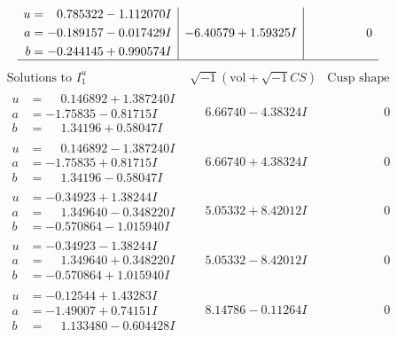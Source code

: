 \documentclass[1p]{elsarticle_modified}
\theoremstyle{definition}
\newcommand{\I}{\sqrt{-1}}
\begin{document}
$$\begin{array}{c|c|c}
\begin{aligned}
u &= \phantom{-}0.785322 - 1.112070 I \\
a &= -0.189157 - 0.017429 I \\
b &= -0.244145 + 0.990574 I\end{aligned}
 & -6.40579 + 1.59325 I & \phantom{-0.000000 } 0\\
 \hline 
 \end{array}$$\newpage$$\begin{array}{c|c|c}  
\text{Solutions to }I^u_{1}& \I (\text{vol} + \sqrt{-1}CS) & \text{Cusp shape}\\
 \hline 
\begin{aligned}
u &= \phantom{-}0.146892 + 1.387240 I \\
a &= -1.75835 - 0.81715 I \\
b &= \phantom{-}1.34196 + 0.58047 I\end{aligned}
 & \phantom{-}6.66740 - 4.38324 I & \phantom{-0.000000 } 0 \\ \hline\begin{aligned}
u &= \phantom{-}0.146892 - 1.387240 I \\
a &= -1.75835 + 0.81715 I \\
b &= \phantom{-}1.34196 - 0.58047 I\end{aligned}
 & \phantom{-}6.66740 + 4.38324 I & \phantom{-0.000000 } 0 \\ \hline\begin{aligned}
u &= -0.34923 + 1.38244 I \\
a &= \phantom{-}1.349640 - 0.348220 I \\
b &= -0.570864 - 1.015940 I\end{aligned}
 & \phantom{-}5.05332 + 8.42012 I & \phantom{-0.000000 } 0 \\ \hline\begin{aligned}
u &= -0.34923 - 1.38244 I \\
a &= \phantom{-}1.349640 + 0.348220 I \\
b &= -0.570864 + 1.015940 I\end{aligned}
 & \phantom{-}5.05332 - 8.42012 I & \phantom{-0.000000 } 0 \\ \hline\begin{aligned}
u &= -0.12544 + 1.43283 I \\
a &= -1.49007 + 0.74151 I \\
b &= \phantom{-}1.133480 - 0.604428 I\end{aligned}
 & \phantom{-}8.14786 - 0.11264 I & \phantom{-0.000000 } 0 \\ \hline\begin{aligned}

\end{aligned}
\end{array}$$
\end{document}
